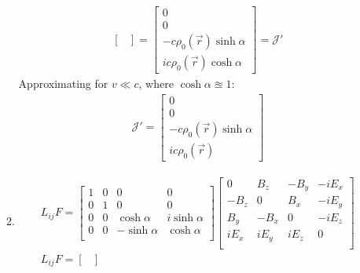 \documentclass[12pt]{article}
\begin{document}
\begin{enumerate}
\begin{enumerate}
\begin{gather*}
\begin{bmatrix}
                \end{bmatrix}=
                \begin{bmatrix}
                    0                            \\
                    0                            \\
                    -c\rho_0(\vec{r})\sinh\alpha \\
                    ic\rho_0(\vec{r})\cosh\alpha
                \end{bmatrix}
                =\mathcal{J}'
            \end{gather*}
            Approximating for $v\ll c$, where $\cosh\alpha\approxeq1$:
            \begin{gather*}
                \mathcal{J}'=
                \begin{bmatrix}
                    0                            \\
                    0                            \\
                    -c\rho_0(\vec{r})\sinh\alpha \\
                    ic\rho_0(\vec{r})
                \end{bmatrix}
            \end{gather*}
            \item
            \begin{gather*}
                L_{ij}F=
                \begin{bmatrix}
                    1 & 0 & 0            & 0            \\
                    0 & 1 & 0            & 0            \\
                    0 & 0 & \cosh\alpha  & i\sinh\alpha \\
                    0 & 0 & -\sinh\alpha & \cosh\alpha  \\
                \end{bmatrix}
                \begin{bmatrix}
                    0    & B_z  & -B_y & -iE_x \\
                    -B_z & 0    & B_x  & -iE_y \\
                    B_y  & -B_x & 0    & -iE_z \\
                    iE_x & iE_y & iE_z & 0     \\
                \end{bmatrix}\\
                L_{ij}F=
                \begin{bmatrix}

\end{bmatrix}
\end{gather*}
\end{enumerate}
\end{enumerate}
\end{document}
